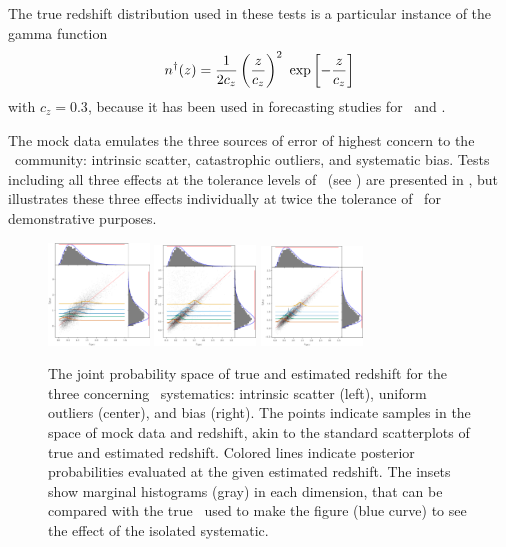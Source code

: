 The true redshift distribution used in these tests is a particular instance of the gamma function
\begin{equation}
\eqlabel{eqn:gamma}
n^{\dagger}(z) = \frac{1}{2 c_{z}} \left(\frac{z}{c_{z}}\right)^{2}\ \exp\left[-\frac{z}{c_{z}}\right]
\end{equation}
with $c_{z} = 0.3$, because it has been used in forecasting studies for \des\ and \lsst.

The mock data emulates the three sources of error of highest concern to the \pz\ community: intrinsic scatter, catastrophic outliers, and systematic bias.
Tests including all three effects at the tolerance levels of \lsst\ (see ) are presented in , but  illustrates these three effects individually at twice the tolerance of \lsst\ for demonstrative purposes.

\begin{figure}
	\begin{center}
		\includegraphics[width=0.24\textwidth]{figures/chippr/scatter_scatplot.png}
		\includegraphics[width=0.24\textwidth]{figures/chippr/outlier_scatplot.png}
		\includegraphics[width=0.24\textwidth]{figures/chippr/bias_scatplot.png}
		\caption{The joint probability space of true and estimated redshift for the three concerning \pz\ systematics: intrinsic scatter (left), uniform outliers (center), and bias (right).
			The points indicate samples in the space of mock data and redshift, akin to the standard scatterplots of true and estimated redshift.
			Colored lines indicate posterior probabilities evaluated at the given estimated redshift.
			The insets show marginal histograms (gray) in each dimension, that can be compared with the true \nz\ used to make the figure (blue curve) to see the effect of the isolated systematic.
		}
	\end{center}
\end{figure}

